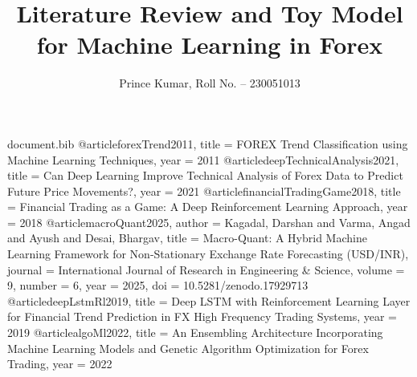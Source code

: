 
\begin{filecontents*}{document.bib}
@article{forexTrend2011,
	title   = {FOREX Trend Classification using Machine Learning Techniques},
	year    = {2011}
}
@article{deepTechnicalAnalysis2021,
	title   = {Can Deep Learning Improve Technical Analysis of Forex Data to Predict Future Price Movements?},
	year    = {2021}
}
@article{financialTradingGame2018,
	title   = {Financial Trading as a Game: A Deep Reinforcement Learning Approach},
	year    = {2018}
}
@article{macroQuant2025,
  author = {Kagadal, Darshan and Varma, Angad and {Ayush} and Desai, Bhargav},
  title = {Macro-Quant: A Hybrid Machine Learning Framework for Non-Stationary Exchange Rate Forecasting ({USD/INR})},
  journal = {International Journal of Research in Engineering \& Science},
  volume = {9},
  number = {6},
  year = {2025},
  doi = {10.5281/zenodo.17929713}
}
@article{deepLstmRl2019,
	title   = {Deep LSTM with Reinforcement Learning Layer for Financial Trend Prediction in FX High Frequency Trading Systems},
	year    = {2019}
}
@article{algoMl2022,
	title   = {An Ensembling Architecture Incorporating Machine Learning Models and Genetic Algorithm Optimization for Forex Trading},
	year    = {2022}
}
\end{filecontents*}

\documentclass[12pt,oneside,letterpaper,english]{article}

\usepackage[T1]{fontenc}
\usepackage[utf8]{inputenc}
\usepackage[margin=2.25cm,headheight=26pt,includeheadfoot]{geometry}
\usepackage[english]{babel}
\usepackage{titlesec}
\usepackage{amsmath,amssymb}
\usepackage[colorlinks=true,linkcolor=black,urlcolor=blue,citecolor=blue]{hyperref}
\usepackage{graphicx}
\usepackage{fancyhdr}
\usepackage{lastpage}
\usepackage{caption}
\usepackage{tocloft}
\usepackage{setspace}
\usepackage{booktabs}
\usepackage{array}
\usepackage{tabularx}
\usepackage{longtable}
\usepackage{lscape}
\usepackage{enumitem}
\usepackage{microtype}
\usepackage{natbib}

\graphicspath{{figures/}}


\title{Literature Review and Toy Model for Machine Learning in Forex}
\author{Prince Kumar, Roll No. -- 230051013}
\newcommand{\supervisorname}{Dr. Raghunath Sahoo\\Dr. Kalindi C. Pradhan}

